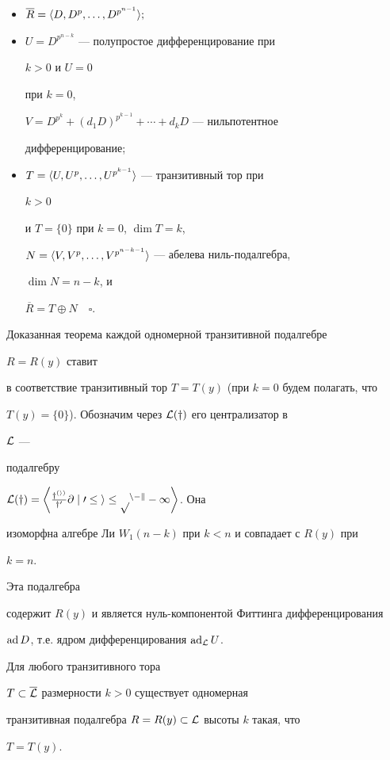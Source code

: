 \begin{itemize}


\item[1)] $\overline R=\langle D,D^p,\dotsc,D^{p^{n-1}}\rangle;$


\item[2)] $U=D^{p^{n-k}}$ --- полупростое дифференцирование при


$k>0$ и $U=0$


при $k=0$,


$V=D^{p^k}+(d_1D)^{p^{k-1}}+\dotsb+d_kD$ --- нильпотентное


дифференцирование;


\item[3)] $T=\langle U,U^p,\dotsc,U^{p^{k-1}}\rangle$ --- транзитивный тор при


$k>0$


и $T=\{0\}$ при $k=0$, $\dim T=k$,


$N=\langle V,V^p,\dotsc,V^{p^{n-k-1}}\rangle$ --- абелева ниль-подалгебра,


$\dim N=n-k$, и


$\overline R=T\oplus N\quad\square$.


\end{itemize}





Доказанная теорема каждой одномерной транзитивной подалгебре


$R=R(y)$ ставит


в соответствие транзитивный тор $T=T(y)$ (при $k=0$ будем полагать, что


$T(y)=\{0\}$). Обозначим через $\cal L(y)$ его централизатор в


$\cal L$ ---


подалгебру


$\cal L(y)=\left\la\frac{y^{(i)}}{y'}\partial\mid


0\le i\le p^{n-k}-1\right\ra$. Она


изоморфна алгебре Ли $W_1(n-k)$ при $k<n$ и совпадает с $R(y)$ при


$k=n$.


Эта подалгебра


содержит $R(y)$ и является нуль-компонентой Фиттинга дифференцирования


$\operatorname{ad} D$, т.е. ядром дифференцирования $\operatorname{ad}_{\cal L}U$.





\begin{thm}


Для любого транзитивного тора


$T\subset\overline{\cal L}$ размерности $k>0$ существует одномерная


транзитивная подалгебра $R=R(y)\subset\cal L$ высоты $k$ такая, что


$T=T(y)$.


\end{thm}






